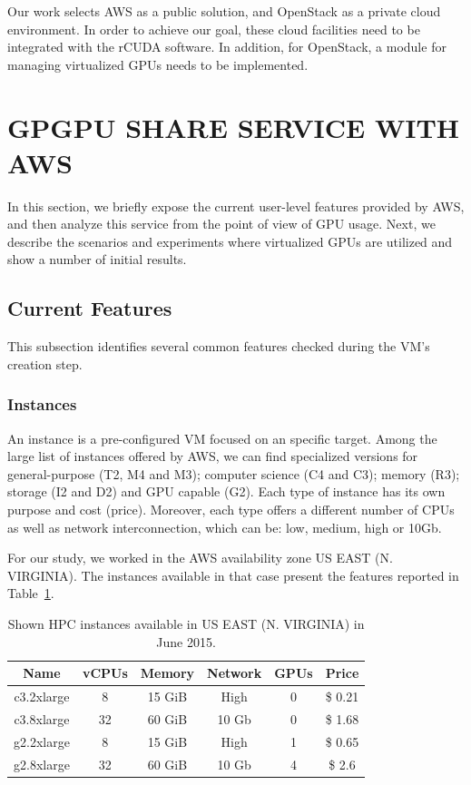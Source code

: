 \documentclass[a4paper,twoside]{article}
\begin{document}
Our work selects AWS as a public 
solution, and OpenStack as a private cloud environment. 
In order to achieve our goal, these cloud facilities need to be integrated with the {rCUDA} software. In addition, for OpenStack, a module for managing virtualized GPUs 
needs to be implemented.  



\section{\uppercase{GPGPU share service with AWS}}
\label{sec:workingaws}
In this section, we briefly expose the current user-level features 
provided by AWS, and then analyze this service  
from the point of view of GPU usage. 
Next, we describe the scenarios and experiments where virtualized GPUs are utilized and show a number of initial results.

\subsection{Current Features}
This subsection identifies several common features checked during 
the VM's creation step.

\subsubsection{Instances}

An instance is a pre-configured VM focused on an 
specific target. Among the large list of instances offered by AWS, 
we can find specialized versions for general-purpose (T2, M4 and M3); computer science (C4 and C3); memory (R3); storage (I2 and D2) and 
GPU capable (G2). Each type of instance has its own purpose and cost (price). 
Moreover, each type offers a different number of CPUs as well as network 
interconnection, which can be: low, medium, high or 10Gb.

For our study, we worked in the AWS availability zone US EAST (N. VIRGINIA). 
The instances available in that case present the features reported in Table~\ref{table:awsInstances}. 

\begin{table}[htb]
\renewcommand{\arraystretch}{1.3}
\caption{Shown HPC instances available in US EAST (N. VIRGINIA) in June 2015.}
\label{table:awsInstances}
\tabcolsep=0.09cm
\begin{center}\begin{tabular}{cccccc}
Name & vCPUs & Memory & Network & GPUs & Price\\ \hline \hline
c3.2xlarge & 8 & 15 GiB & High & 0 & \$ 0.21\\ \hline
c3.8xlarge & 32 & 60 GiB & 10 Gb & 0 & \$ 1.68 \\ \hline
g2.2xlarge & 8 & 15 GiB & High & 1 & \$ 0.65\\ \hline
g2.8xlarge & 32 & 60 GiB & 10 Gb & 4 & \$ 2.6 \\ \hline
\end{tabular}\end{center}\end{table}
\end{document}
